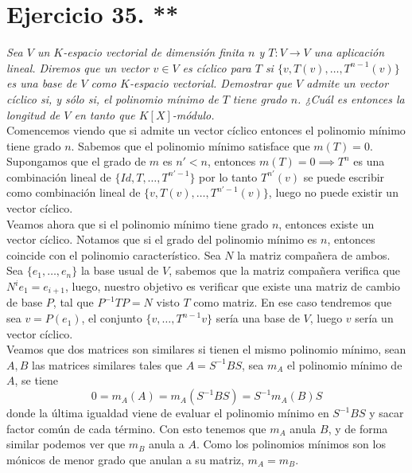 \section{Ejercicio 35. **} \textit{Sea \(V\) un \(K\)-espacio
  vectorial de dimensión finita \(n\) y \(T:V \to V\) una
  aplicación lineal. Diremos que un vector \(v \in V\) es cíclico para
  \(T\) si \(\{v, T(v), \dots, T^{n-1}(v)\}\) es una base de \(V\)
  como \(K\)-espacio vectorial. Demostrar que \(V\) admite un vector cíclico si,
  y sólo si, el polinomio mínimo de \(T\) tiene grado \(n\). ¿Cuál es entonces
  la longitud de \(V\) en tanto que \(K[X]\)-módulo.}\\


Comencemos viendo que si admite un vector cíclico entonces el polinomio mínimo
tiene grado \(n\). Sabemos que el polinomio mínimo satisface que \(m(T)=0\). Supongamos que el
grado de \(m\) es \(n' < n\),  entonces \(m(T)=0 \implies T^{n}\) es una
combinación lineal de \(\{Id,T,\dots,T^{n'-1}\}\) por lo tanto \(T^{n'}(v)\) se
puede escribir como combinación lineal de \(\{v,T(v),\dots,T^{n'-1}(v)\}\),
luego no puede existir un vector cíclico.\\

Veamos ahora que si el polinomio mínimo tiene grado \(n\), entonces existe un
vector cíclico. Notamos que si el grado del polinomio mínimo es \(n\), entonces
coincide con el polinomio característico. Sea \(N\) la matriz compañera de
ambos. Sea \(\{e_1,\dots,e_n\}\) la base usual de \(V\), sabemos que la matriz
compañera verifica que \(N^i e_1 = e_{i+1}\), luego, nuestro objetivo es
verificar que existe una matriz de cambio de base \(P\), tal que \(P^{-1}TP =
N\) visto \(T\) como matriz. En ese caso tendremos que sea \(v = P(e_1)\), el conjunto
\(\{v,\dots,T^{n-1}v\}\) sería una base de \(V\), luego \(v\) sería un vector
cíclico.\\

Veamos que dos matrices son similares si tienen el mismo polinomio mínimo, sean
\(A, B\) las matrices similares tales que \(A = S^{-1}BS\), sea \(m_A\) el
polinomio mínimo de \(A\), se tiene
\[
  0 = m_A(A) = m_A(S^{-1}BS) = S^{-1}m_A(B)S
\]
donde la última igualdad viene de evaluar el polinomio mínimo en \(S^{-1}BS\) y
sacar factor común de cada término. Con esto tenemos que \(m_A\) anula \(B\), y
de forma similar podemos ver que \(m_B\) anula a \(A\). Como los polinomios
mínimos son los mónicos de menor grado que anulan a su matriz, \(m_A = m_B\).\\

